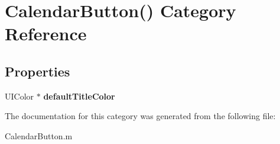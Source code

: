 \hypertarget{category_calendar_button_07_08}{\section{Calendar\+Button() Category Reference}
\label{category_calendar_button_07_08}
}
\subsection*{Properties}
\begin{DoxyCompactItemize}
\item 
\hypertarget{category_calendar_button_07_08_a1db2007a9764b64e2994752bc7f94347}{U\+I\+Color $\ast$ {\bfseries default\+Title\+Color}}\label{category_calendar_button_07_08_a1db2007a9764b64e2994752bc7f94347}

\end{DoxyCompactItemize}


The documentation for this category was generated from the following file\+:\begin{DoxyCompactItemize}
\item 
Calendar\+Button.\+m\end{DoxyCompactItemize}
